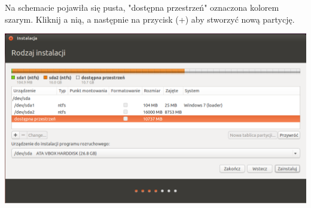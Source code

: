 Na schemacie pojawiła się pusta, "dostępna przestrzeń" oznaczona kolorem szarym. Kliknij a nią, a następnie na przycisk (+) aby stworzyć nową partycję.
\begin{center}
	\includegraphics[scale=0.7]{images/instalator_partycjonowanie_gparted3.png}
\end{center}
\clearpage

